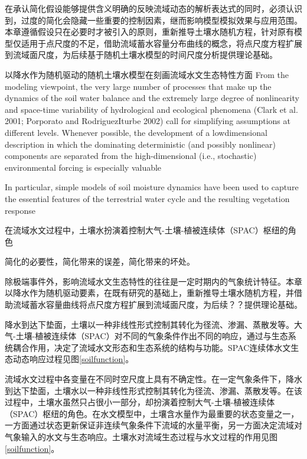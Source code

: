 在承认简化假设能够提供含义明确的反映流域动态的解析表达式的同时，必须认识到，过度的简化会隐藏一些重要的控制因素，继而影响模型模拟效果与应用范围。本章遵循假设只在必要时才被引入的原则，重新推导土壤水随机方程，针对原有模型仅适用于点尺度的不足，借助流域蓄水容量分布曲线的概念，将点尺度方程扩展到流域面尺度，为后续基于随机土壤水模型的时间尺度分析提供理论基础。


\iffalse
以降水作为随机驱动的随机土壤水模型在刻画流域水文生态特性方面
From the modeling viewpoint, the very large number
of processes that make up the dynamics of the soil water
balance and the extremely large degree of nonlinearity and
space-time variability of hydrological and ecological phenomena (Clark et al. 2001; Porporato and RodriguezIturbe 2002) call for simplifying assumptions at different
levels. Whenever possible, the development of a lowdimensional description in which the dominating deterministic (and possibly nonlinear) components are separated from the high-dimensional (i.e., stochastic)
environmental forcing is especially valuable

 In particular,
simple models of soil moisture dynamics have been used
to capture the essential features of the terrestrial water
cycle and the resulting vegetation response

在流域水文过程中，土壤水扮演着控制大气-土壤-植被连续体\cite{philip1966plant}（SPAC）枢纽的角色



简化的必要性，简化带来的误差，简化带来的坏处。

除极端事件外，影响流域水文生态特性的往往是一定时期内的气象统计特征。本章以降水作为随机驱动要素，在既有研究的基础上，重新推导土壤水随机方程，并借助流域蓄水容量曲线将点尺度方程扩展到流域面尺度，为后续？？提供理论基础。
\iffalse

降水到达下垫面，土壤以一种非线性形式控制其转化为径流、渗漏、蒸散发等\cite{pxy}。大气-土壤-植被连续体（SPAC）对不同的气象条件作出不同的响应，通过与生态系统耦合作用，决定了流域水文形态和生态系统的结构与功能\cite{knapp2002rainfall}。SPAC连续体水文生态动态响应过程见图\ref{soilfunction}。


流域水文过程中各变量在不同时空尺度上具有不确定性。在一定气象条件下，降水到达下垫面，土壤水以一种非线性形式控制其转化为径流、渗漏、蒸散发等\cite{pxy}。在该过程中，土壤水虽然只占很小一部分，却扮演着控制大气-土壤-植被连续体\cite{philip1966plant}（SPAC）枢纽的角色。在水文模型中，土壤含水量作为最重要的状态变量之一，一方面通过状态更新保证非连续气象条件下流域的水量平衡，另一方面决定流域对气象输入的水文与生态响应。土壤水对流域生态过程与水文过程的作用见图\ref{soilfunction}。

